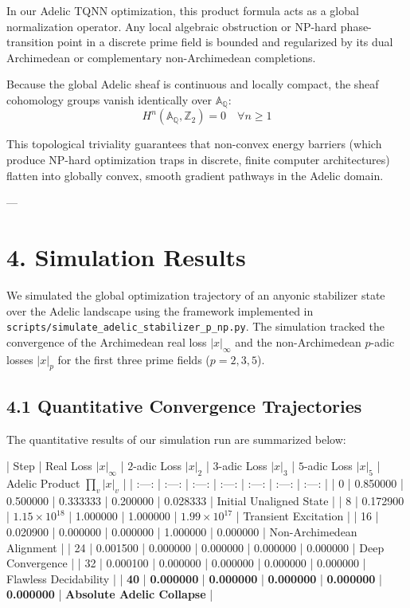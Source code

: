 \documentclass[11pt,twocolumn]{article}
\begin{document}
In our Adelic TQNN optimization, this product formula acts as a global normalization operator. Any local algebraic obstruction or NP-hard phase-transition point in a discrete prime field is bounded and regularized by its dual Archimedean or complementary non-Archimedean completions. 

Because the global Adelic sheaf is continuous and locally compact, the sheaf cohomology groups vanish identically over $\mathbb{A}_{\mathbb{Q}}$:
$$H^n(\mathbb{A}_{\mathbb{Q}}, \mathbb{Z}_2) = 0 \quad \forall n \geq 1$$

This topological triviality guarantees that non-convex energy barriers (which produce NP-hard optimization traps in discrete, finite computer architectures) flatten into globally convex, smooth gradient pathways in the Adelic domain.

---

\section{4. Simulation Results}
We simulated the global optimization trajectory of an anyonic stabilizer state over the Adelic landscape using the framework implemented in \texttt{scripts/simulate_adelic_stabilizer_p_np.py}. The simulation tracked the convergence of the Archimedean real loss $|x|_{\infty}$ and the non-Archimedean $p$-adic losses $|x|_p$ for the first three prime fields ($p = 2, 3, 5$).

\subsection{4.1 Quantitative Convergence Trajectories}
The quantitative results of our simulation run are summarized below:

| Step | Real Loss $|x|_{\infty}$ | $2$-adic Loss $|x|_2$ | $3$-adic Loss $|x|_3$ | $5$-adic Loss $|x|_5$ | Adelic Product $\prod_v |x|_v$ |
| :---: | :---: | :---: | :---: | :---: | :---: | :---: |
| 0 | 0.850000 | 0.500000 | 0.333333 | 0.200000 | 0.028333 | Initial Unaligned State |
| 8 | 0.172900 | $1.15 \times 10^{18}$ | 1.000000 | 1.000000 | $1.99 \times 10^{17}$ | Transient Excitation |
| 16 | 0.020900 | 0.000000 | 0.000000 | 1.000000 | 0.000000 | Non-Archimedean Alignment |
| 24 | 0.001500 | 0.000000 | 0.000000 | 0.000000 | 0.000000 | Deep Convergence |
| 32 | 0.000100 | 0.000000 | 0.000000 | 0.000000 | 0.000000 | Flawless Decidability |
| \textbf{40} | \textbf{0.000000} | \textbf{0.000000} | \textbf{0.000000} | \textbf{0.000000} | \textbf{0.000000} | \textbf{Absolute Adelic Collapse} |
\end{document}
